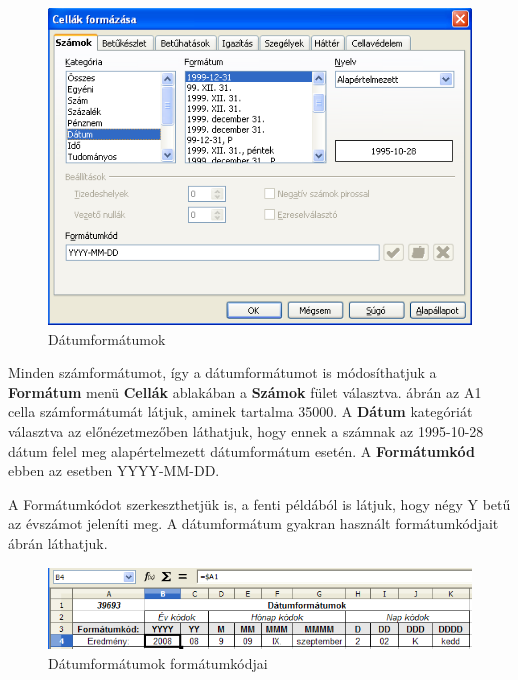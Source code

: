 \begin{figure}[!h]
\begin{center}
\includegraphics[width=13.944cm]{oocalcv2-img46.png}
\caption{Dátumformátumok}\label{Dátumformátumok}
\end{center}
\end{figure}

Minden számformátumot, így a dátumformátumot is
módosíthatjuk a \textbf{Formátum} menü \textbf{Cellák}
ablakában a \textbf{Számok} fület választva.  ábrán
az A1 cella számformátumát látjuk, aminek tartalma 35000. A
\textbf{Dátum} kategóriát választva az
előnézetmezőben láthatjuk, hogy ennek a  számnak az
1995-10-28 dátum felel meg alapértelmezett dátumformátum
esetén. A \textbf{Formátumkód} ebben az esetben YYYY-MM-DD.

A Formátumkódot szerkeszthetjük is, a fenti példából is
látjuk, hogy négy Y betű az évszámot jeleníti meg. A
dátumformátum gyakran használt formátumkódjait 
ábrán láthatjuk.

\begin{figure}[!h]
\begin{center}
\includegraphics[width=15.999cm]{oocalcv2-img47.png}
\caption{Dátumformátumok formátumkódjai}\label{DátumFormátumkódjai}
\end{center}
\end{figure}

